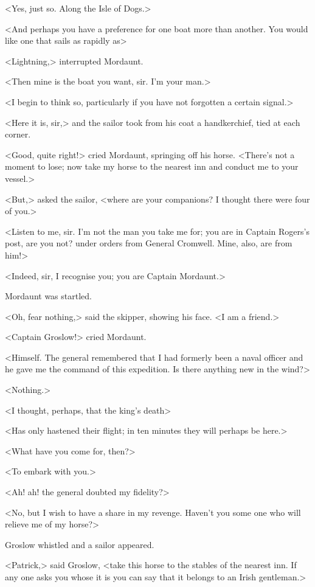 <Yes, just so. Along the Isle of Dogs.>

<And perhaps you have a preference for one boat more than another. You would like one that sails as rapidly as\longdash>

<Lightning,> interrupted Mordaunt.

<Then mine is the boat you want, sir. I'm your man.>

<I begin to think so, particularly if you have not forgotten a certain signal.>

<Here it is, sir,> and the sailor took from his coat a handkerchief, tied at each corner.

<Good, quite right!> cried Mordaunt, springing off his horse. <There's not a moment to lose; now take my horse to the nearest inn and conduct me to your vessel.>

<But,> asked the sailor, <where are your companions? I thought there were four of you.>

<Listen to me, sir. I'm not the man you take me for; you are in Captain Rogers's post, are you not? under orders from General Cromwell. Mine, also, are from him!>

<Indeed, sir, I recognise you; you are Captain Mordaunt.>

Mordaunt was startled.

<Oh, fear nothing,> said the skipper, showing his face. <I am a friend.>

<Captain Groslow!> cried Mordaunt.

<Himself. The general remembered that I had formerly been a naval officer and he gave me the command of this expedition. Is there anything new in the wind?>

<Nothing.>

<I thought, perhaps, that the king's death\longdash>

<Has only hastened their flight; in ten minutes they will perhaps be here.>

<What have you come for, then?>

<To embark with you.>

<Ah! ah! the general doubted my fidelity?>

<No, but I wish to have a share in my revenge. Haven't you some one who will relieve me of my horse?>

Groslow whistled and a sailor appeared.

<Patrick,> said Groslow, <take this horse to the stables of the nearest inn. If any one asks you whose it is you can say that it belongs to an Irish gentleman.>

